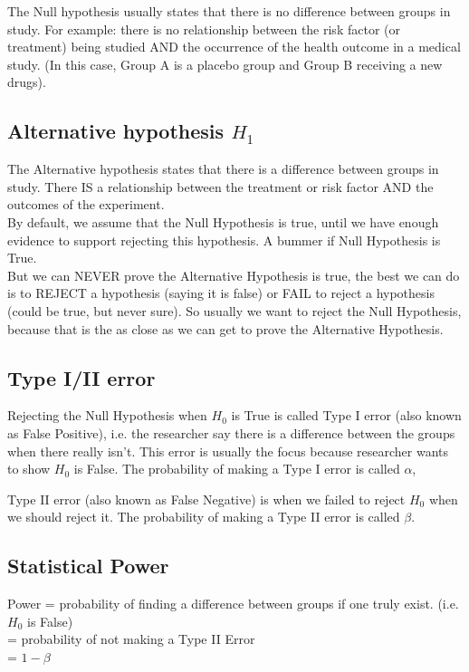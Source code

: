 The Null hypothesis usually states that there is no difference between groups in study. For example: there is no relationship between the risk factor (or treatment) being studied AND the occurrence of the health outcome in a medical study. (In this case, Group A is a placebo group and Group B receiving a new drugs).

\subsection{Alternative hypothesis $H_1$}

The Alternative hypothesis states that there is a difference between groups in study. There IS a relationship between the treatment or risk factor AND the outcomes of the experiment.\\

By default, we assume that the Null Hypothesis is true, until we have enough evidence to support rejecting this hypothesis. A bummer if Null Hypothesis is True. \\

But we can NEVER prove the Alternative Hypothesis is true, the best we can do is to REJECT a hypothesis (saying it is false) or FAIL to reject a hypothesis (could be true, but never sure). So usually we want to reject the Null Hypothesis, because that is the as close as we can get to prove the Alternative Hypothesis.

\subsection{Type I/II error}

Rejecting the Null Hypothesis when $H_0$ is True is called Type I error (also known as False Positive), i.e. the researcher say there is a difference between the groups when there really isn't. This error is usually the focus because researcher wants to show $H_0$ is False. The probability of making a Type I error is called $\alpha$, 

Type II error (also known as False Negative) is when we failed to reject $H_0$ when we should reject it. The probability of making a Type II error is called $\beta$. 

\subsection{Statistical Power}

Power = probability of finding a difference between groups if one truly exist. (i.e. $H_0$ is False)\\
= probability of not making a Type II Error \\
= $1 - \beta$\\

